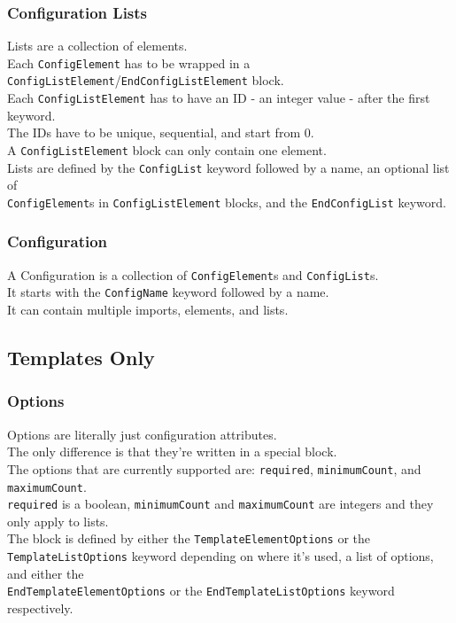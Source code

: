 \documentclass[12pt]{article}
\begin{document}
    \subsubsection{Configuration Lists}
    Lists are a collection of elements. \\
    Each \texttt{ConfigElement} has to be wrapped in a \texttt{ConfigListElement}/\texttt{EndConfigListElement} block. \\
    Each \texttt{ConfigListElement} has to have an ID - an integer value - after the first keyword. \\
    The IDs have to be unique, sequential, and start from 0. \\
    A \texttt{ConfigListElement} block can only contain one element. \\
    Lists are defined by the \texttt{ConfigList} keyword followed by a name, an optional list of\\ \texttt{ConfigElement}s in \texttt{ConfigListElement} blocks, and the \texttt{EndConfigList} keyword.

    \subsubsection{Configuration}
    A Configuration is a collection of \texttt{ConfigElement}s and \texttt{ConfigList}s. \\
    It starts with the \texttt{ConfigName} keyword followed by a name. \\
    It can contain multiple imports, elements, and lists.

    \newpage

    \subsection{Templates Only}

    \subsubsection{Options}
    Options are literally just configuration attributes. \\
    The only difference is that they're written in a special block. \\
    The options that are currently supported are: \texttt{required}, \texttt{minimumCount}, and \texttt{maximumCount}. \\
    \texttt{required} is a boolean, \texttt{minimumCount} and \texttt{maximumCount} are integers and they only apply to lists. \\
    The block is defined by either the \texttt{TemplateElementOptions} or the \texttt{TemplateListOptions} keyword depending on where it's used, a list of options, and either the \\ \texttt{EndTemplateElementOptions} or the \texttt{EndTemplateListOptions} keyword respectively.
\end{document}
